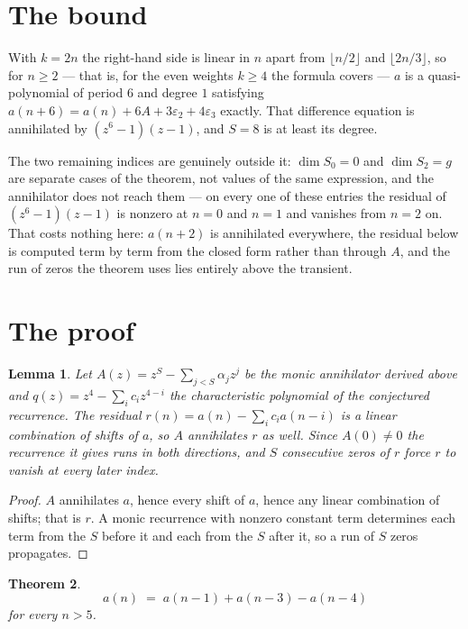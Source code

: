 \documentclass[11pt,a4paper]{article}
\theoremstyle{plain}
\newtheorem{theorem}{Theorem}
\newtheorem{lemma}[theorem]{Lemma}
\theoremstyle{definition}
\begin{document}
\section{The bound}

With $k=2n$ the right-hand side is linear in $n$ apart from $\lfloor n/2\rfloor$ and
$\lfloor 2n/3\rfloor$, so for $n\ge2$ --- that is, for the even weights $k\ge4$ the formula
covers --- $a$ is a quasi-polynomial of period $6$ and degree $1$ satisfying
$a(n+6)=a(n)+6A+3\varepsilon_2+4\varepsilon_3$ exactly. That difference equation is annihilated
by $(z^6-1)(z-1)$, and $S=8$ is at least its degree.

The two remaining indices are genuinely outside it: $\dim S_0=0$ and $\dim S_2=g$ are separate
cases of the theorem, not values of the same expression, and the annihilator does not reach
them --- on every one of these entries the residual of $(z^6-1)(z-1)$ is nonzero at $n=0$ and
$n=1$ and vanishes from $n=2$ on. That costs nothing here: $a(n+2)$ is annihilated everywhere,
the residual below is computed term by term from the closed form rather than through $A$, and
the run of zeros the theorem uses lies entirely above the transient.

\section{The proof}

\begin{lemma}\label{lem:crit}
Let $A(z)=z^S-\sum_{j<S}\alpha_jz^{j}$ be the monic annihilator derived above and
$q(z)=z^{4}-\sum_ic_iz^{4-i}$ the characteristic polynomial of the conjectured
recurrence. The residual $r(n)=a(n)-\sum_ic_ia(n-i)$ is a linear combination of shifts of $a$,
so $A$ annihilates $r$ as well. Since $A(0)\ne0$ the recurrence it gives runs in both
directions, and $S$ consecutive zeros of $r$ force $r$ to vanish at every later index.
\end{lemma}

\begin{proof}
$A$ annihilates $a$, hence every shift of $a$, hence any linear combination of shifts; that is
$r$. A monic recurrence with nonzero constant term determines each term from the $S$ before it
and each from the $S$ after it, so a run of $S$ zeros propagates.
\end{proof}

\begin{theorem}
\[
a(n)\;=\;a(n-1) + a(n-3) - a(n-4)
\]
for every $n>5$.
\end{theorem}
\end{document}
